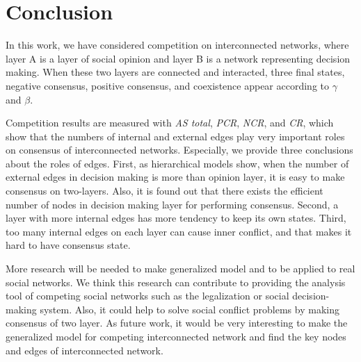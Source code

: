 \documentclass[english]{cccconf}
\begin{document}
\section{Conclusion}
In this work, we have considered competition on interconnected networks, where layer A is a layer of social opinion and layer B is a network representing decision making. When these two layers are connected and interacted, three final states, negative consensus, positive consensus, and coexistence appear according to $\gamma$ and $\beta$. 

Competition results are measured with \textit{AS total}, \textit{PCR}, \textit{NCR}, and \textit{CR}, which show that the numbers of internal and external edges play very important roles on consensus of interconnected networks. Especially, we provide three conclusions about the roles of edges. First, as hierarchical models show, when the number of external edges in decision making is more than opinion layer, it is easy to make consensus on two-layers.  Also, it is found out that there exists the efficient number of nodes in decision making layer for performing consensus. Second, a layer with more internal edges has more tendency to keep its own states. Third, too many internal edges on each layer can cause inner conflict, and that makes it hard to have consensus state.  

More research will be needed to make generalized model and to be applied to real social networks. We think this research can contribute to providing the analysis tool of competing social networks such as the legalization or social decision-making system. Also, it could help to solve social conflict problems by making consensus of two layer. As future work, it would be very interesting to make the generalized model for competing interconnected network and find the key nodes and edges of interconnected network.
\end{document}
